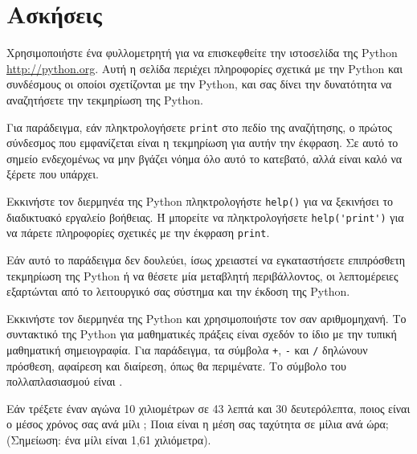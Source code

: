 \documentclass[10pt]{book}
\begin{document}
\section{Ασκήσεις}


\begin{exercise}
Χρησιμοποιήστε ένα φυλλομετρητή για να επισκεφθείτε την ιστοσελίδα της Python \url{http://python.org}.  
Αυτή η σελίδα περιέχει πληροφορίες σχετικά με την  Python 
και συνδέσμους οι οποίοι σχετίζονται με την  Python, 
και σας δίνει την δυνατότητα να αναζητήσετε την τεκμηρίωση της  Python.

 Για παράδειγμα, εάν πληκτρολογήσετε  {\tt print}  στο πεδίο της
αναζήτησης, ο πρώτος σύνδεσμος που εμφανίζεται είναι η τεκμηρίωση για αυτήν
την έκφραση.  Σε αυτό το σημείο ενδεχομένως να μην βγάζει νόημα όλο αυτό το κατεβατό, αλλά είναι καλό να ξέρετε που υπάρχει.
\\
\end{exercise}


\begin{exercise}
Εκκινήστε τον διερμηνέα της  Python  πληκτρολογήστε  {\tt help()} 
για να ξεκινήσει το διαδικτυακό εργαλείο βοήθειας.  Ή μπορείτε να πληκτρολογήσετε \verb"help('print')" για να πάρετε πληροφορίες σχετικές με την έκφραση {\tt print}.

Εάν αυτό το παράδειγμα δεν δουλεύει, ίσως χρειαστεί να εγκαταστήσετε επιπρόσθετη τεκμηρίωση της  Python  ή να θέσετε μία μεταβλητή περιβάλλοντος, οι λεπτομέρειες εξαρτώνται από το λειτουργικό σας σύστημα και την έκδοση της  Python. 
\\
\end{exercise}


\begin{exercise}
Εκκινήστε τον διερμηνέα της  Python  και χρησιμοποιήστε τον
σαν αριθμομηχανή.  Το συντακτικό της  Python  για μαθηματικές
πράξεις είναι σχεδόν το ίδιο με την τυπική μαθηματική σημειογραφία.  
Για παράδειγμα, τα σύμβολα {\tt +}, {\tt -} και {\tt /}
δηλώνουν πρόσθεση, αφαίρεση και διαίρεση, όπως θα περιμένατε.  
Το σύμβολο του πολλαπλασιασμού είναι {\tt *}.  

Εάν τρέξετε έναν αγώνα 10 χιλιομέτρων σε 43 λεπτά και 30 δευτερόλεπτα,
ποιος είναι ο μέσος χρόνος σας ανά μίλι ;  Ποια είναι η μέση σας ταχύτητα
σε μίλια ανά ώρα; (Σημείωση: ένα μίλι είναι 1,61 χιλιόμετρα).
\end{exercise}
\end{document}
